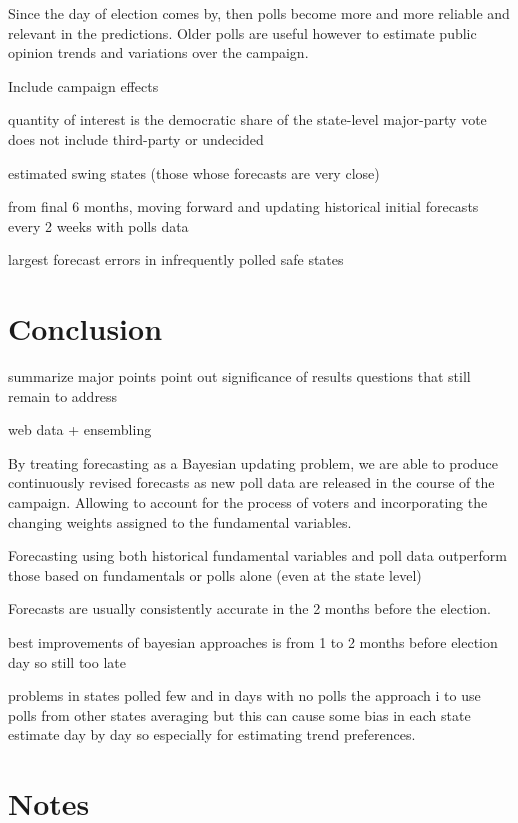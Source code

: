 \documentclass[
  12pt]{article}
\begin{document}
Since the day of election comes by, then polls become more and more
reliable and relevant in the predictions. Older polls are useful however
to estimate public opinion trends and variations over the campaign.

Include campaign effects

quantity of interest is the democratic share of the state-level
major-party vote does not include third-party or undecided

estimated swing states (those whose forecasts are very close)

from final 6 months, moving forward and updating historical initial
forecasts every 2 weeks with polls data

largest forecast errors in infrequently polled safe states

\hypertarget{sec-conc}{%
\section{Conclusion}\label{sec-conc}}

summarize major points point out significance of results questions that
still remain to address

web data + ensembling

By treating forecasting as a Bayesian updating problem, we are able to
produce continuously revised forecasts as new poll data are released in
the course of the campaign. Allowing to account for the process of
voters and incorporating the changing weights assigned to the
fundamental variables.

Forecasting using both historical fundamental variables and poll data
outperform those based on fundamentals or polls alone (even at the state
level)

Forecasts are usually consistently accurate in the 2 months before the
election.

best improvements of bayesian approaches is from 1 to 2 months before
election day so still too late

problems in states polled few and in days with no polls the approach i
to use polls from other states averaging but this can cause some bias in
each state estimate day by day so especially for estimating trend
preferences.

\hypertarget{notes}{%
\section{Notes}\label{notes}}
\end{document}
